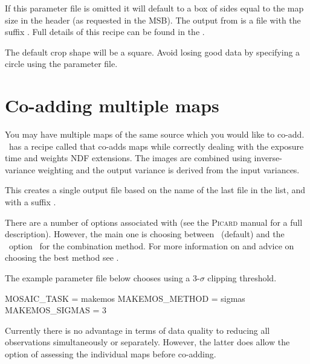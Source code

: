 \documentclass[11pt,oneside,chapters]{starlink}
\begin{document}
If this parameter file is omitted it will default to a box of sides
equal to the map size in the header (as requested in the MSB). The
output from  is a file with the suffix
. Full details of this recipe can be found in the
.

\begin{tip}
The default crop shape will be a square. Avoid losing good data
by specifying a circle using the parameter file.
\end{tip}

\section{Co-adding multiple maps}
\label{sec:coadd}

You may have multiple maps of the same source which you would like to
co-add. \picard\ has a recipe called
that co-adds maps while correctly dealing with the exposure time and
weights NDF extensions. The images are combined using inverse-variance
weighting and the output variance is derived from the input variances.
\begin{terminalv}
\end{terminalv}
This creates a single output file based on the name of the last file
in the list, and with a suffix .

There are a number of options associated with
 (see the \textsc{Picard} manual for a full
description). However, the main one is choosing between \wcsmosaic\
(default) and the \ccdpack\ option \makemos\ for the combination
method. For more information on \task{makemos} and advice on choosing the
best method see \xref{\textbf{SUN/139}}{sun139}{}.

The example parameter file below chooses  using a 3-$\sigma$
clipping threshold.

\begin{terminalv}
MOSAIC_TASK = makemos
MAKEMOS_METHOD = sigmas
MAKEMOS_SIGMAS = 3
\end{terminalv}

Currently there is no advantage in terms of data quality to reducing
all observations simultaneously or separately. However, the latter
does allow the option of assessing the individual maps before co-adding.
\end{document}

